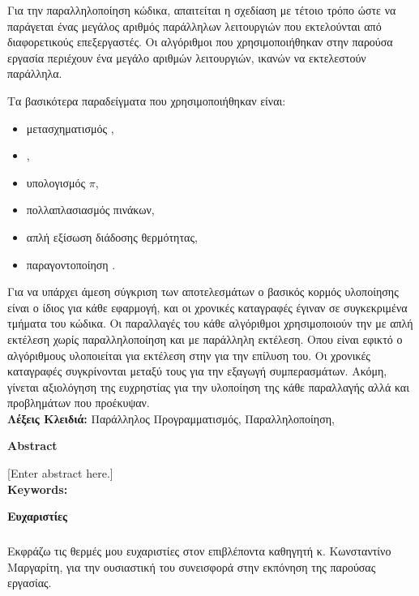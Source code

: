 Για την παραλληλοποίηση κώδικα, απαιτείται η σχεδίαση με τέτοιο τρόπο ώστε να παράγεται ένας μεγάλος αριθμός παράλληλων λειτουργιών που εκτελούνται από διαφορετικούς επεξεργαστές. Οι  αλγόριθμοι που χρησιμοποιήθηκαν στην παρούσα εργασία περιέχουν ένα μεγάλο αριθμών λειτουργιών, ικανών να εκτελεστούν παράλληλα. 

Τα βασικότερα παραδείγματα που χρησιμοποιήθηκαν είναι:
\begin{itemize}
    \item μετασχηματισμός , 
    \item {},
    \item υπολογισμός $\pi$, 
    \item πολλαπλασιασμός πινάκων,
    \item απλή εξίσωση διάδοσης θερμότητας,
    \item παραγοντοποίηση .
\end{itemize}

      
Για να υπάρχει άμεση σύγκριση των αποτελεσμάτων ο βασικός κορμός υλοποίησης είναι ο ίδιος για κάθε εφαρμογή, και οι χρονικές καταγραφές έγιναν σε συγκεκριμένα τμήματα του κώδικα. Οι παραλλαγές του κάθε αλγόριθμοι χρησιμοποιούν την  με απλή εκτέλεση χωρίς παραλληλοποίηση και με παράλληλη εκτέλεση. Οπου είναι εφικτό ο αλγόριθμους υλοποιείται  για εκτέλεση στην  για την επίλυση του. Οι χρονικές καταγραφές συγκρίνονται μεταξύ τους για την εξαγωγή συμπερασμάτων. Ακόμη, γίνεται αξιολόγηση της ευχρηστίας για την υλοποίηση της κάθε παραλλαγής αλλά και προβλημάτων που προέκυψαν.\\[1 cm]

\indent \textbf{Λέξεις Κλειδιά:}
Παράλληλος Προγραμματισμός, Παραλληλοποίηση, 

\clearpage
{}
\begin{flushleft}

{\large \textbf{Abstract}}\\[0.5 cm]
\end{flushleft}
[Enter abstract here.]\\[1 cm]
\indent \textbf{Keywords:}

\clearpage
{}
\begin{flushleft}
{\large \textbf{Ευχαριστίες}}\\[0.5 cm]
\end{flushleft}
\subparagraph{}
Εκφράζω τις θερμές μου ευχαριστίες στον επιβλέποντα καθηγητή κ. Κωνσταντίνο Μαργαρίτη, για την ουσιαστική του συνεισφορά στην εκπόνηση της παρούσας εργασίας.

\clearpage
\singlespacing
\tableofcontents
{}

\renewcommand{\listfigurename}{Κατάλογος Εικόνων (αν υπάρχουν)}
\clearpage
\listoffigures

\renewcommand{\listtablename}{Κατάλογος Πινάκων (αν υπάρχουν)}
\clearpage
\listoftables

\clearpage
\begin{flushleft}
\lstlistoflistings
\end{flushleft}

\clearpage
\setcounter{page}{1}
